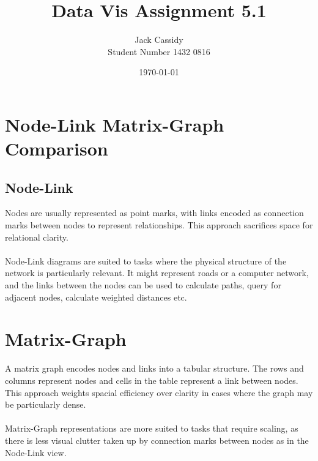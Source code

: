 \documentclass[12pt]{article}
\begin{document}
\title{Data Vis Assignment 5.1}
\author{Jack Cassidy \\ Student Number 1432 0816}
\date{\today}
\maketitle

\section{Node-Link Matrix-Graph Comparison}
\subsection{Node-Link}
Nodes are usually represented as point marks, with links encoded as connection marks between nodes to represent relationships. This approach sacrifices space for relational clarity. \paragraph{}

Node-Link diagrams are suited to tasks where the physical structure of the network is particularly relevant. It might represent roads or a computer network, and the links between the nodes can be used to calculate paths, query for adjacent nodes, calculate weighted distances etc.

\section{Matrix-Graph}
A matrix graph encodes nodes and links into a tabular structure. The rows and columns represent nodes and cells in the table represent a link between nodes. This approach weights spacial efficiency over clarity in cases where the graph may be particularly dense. \paragraph{}

Matrix-Graph representations are more suited to tasks that require scaling, as there is less visual clutter taken up by connection marks between nodes as in the Node-Link view.
\end{document}
